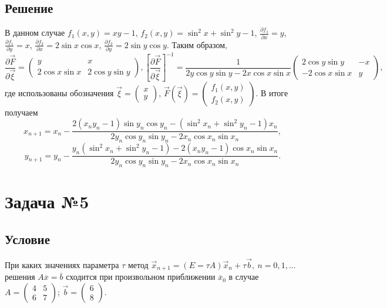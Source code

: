 \documentclass[a4paper, 12pt]{article}
\begin{document}
	\subsection*{Решение}
	В данном случае $f_1(x,y)=xy-1$, $f_2(x,y)=\sin^2x+\sin^2y-1$, $\frac{\partial f_1}{\partial x}=y$, $\frac{\partial f_1}{\partial y}=x$, $\frac{\partial f_2}{\partial x}=2\sin x\cos x$, $\frac{\partial f_2}{\partial y}=2\sin y\cos y$. Таким образом,
	\begin{equation*}
	\frac{\partial \vec{F}}{\partial\vec{\xi}}=\left(\begin{matrix}
	y & x\\
	2\cos x\sin x & 2\cos y\sin y
	\end{matrix}\right),\left[\frac{\partial\vec{F}}{\partial\vec{\xi}}\right]^{-1}=\frac{1}{2y\cos y\sin y-2x\cos x\sin x}\left(\begin{matrix}
	2\cos y\sin y & -x\\
	-2\cos x\sin x & y
	\end{matrix}\right),
	\end{equation*}
	где использованы обозначения $\vec{\xi}=\left(\begin{matrix}
	x\\
	y
	\end{matrix}\right)$, $\vec{F}\left(\vec{\xi}\right)=\left(\begin{matrix}
	f_1(x,y)\\
	f_2(x,y)
	\end{matrix}\right)$. В итоге получаем
	\begin{equation*}
		x_{n+1}=x_n-\frac{2(x_ny_n-1)\sin y_n\cos y_n-(\sin^2x_n+\sin^2y_n-1)x_n}{2y_n\cos y_n\sin y_n-2x_n\cos x_n\sin x_n},
	\end{equation*}
	\begin{equation*}
		y_{n+1}=y_n-\frac{y_n(\sin^2x_n+\sin^2y_n-1)-2(x_ny_n-1)\cos x_n\sin x_n}{2y_n\cos y_n\sin y_n-2x_n\cos x_n\sin x_n}.
	\end{equation*}
	\section*{Задача №5}
	\subsection*{Условие}
	При каких значениях параметра $\tau$ метод $\vec{x}_{n+1}=(E=\tau A)\vec{x}_n+\tau\vec{b},\ n=0,1,...$ решения $A\overline{x}=\overline{b}$ сходится при произвольном приближении $\overline{x}_0$ в случае $A=\left(
	\begin{matrix}
	4 & 5\\
	6 & 7
	\end{matrix}
	\right)$; $\vec{b}=\left(
	\begin{matrix}
	6\\
	8
	\end{matrix}
	\right)$.
\end{document}
